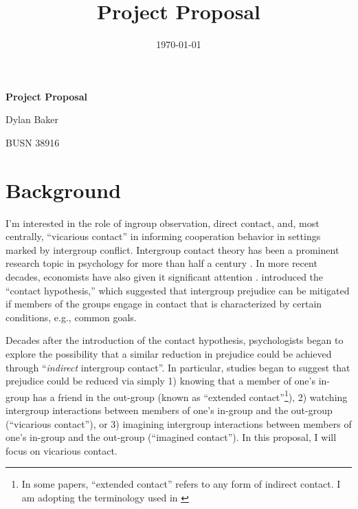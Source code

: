 \documentclass[10pt]{article}
\title{Project Proposal}
\newif\ifdraft
\begin{document}
\begin{titlepage}
    \pagestyle{empty} %
    \centering
    \vspace*{\fill}
    {\Huge\bfseries Project Proposal\par}
    \vspace{1.5cm}
    {\Large Dylan Baker\par}
    \vspace{1.5cm}
    {\large BUSN 38916\par}
    \vfill
    \date{\today}
\end{titlepage}

\newpage 


\section{Background}

I'm interested in the role of ingroup observation, direct contact, 
and, most centrally, ``vicarious contact'' in informing cooperation behavior
in settings marked by intergroup conflict.
Intergroup contact theory
\ifdraft(allport1954) \else\parencite{allport1954} \fi
has been a 
prominent research topic in 
psychology for more than half a century
\ifdraft(hewstone2011) \else\parencite{hewstone2011} \fi. 
In more recent decades, 
economists have also given 
it
significant attention
\ifdraft(bazzi2019, lowe2021) \else\parencite{bazzi2019, lowe2021} \fi
. 
\ifdraft(allport1954) \else\textcite{allport1954} \fi 
introduced the ``contact hypothesis,'' which
suggested that intergroup prejudice can be mitigated if members of 
the groups engage in contact that
is characterized by certain conditions, e.g., common goals.

Decades after the introduction of the contact hypothesis,
psychologists began to explore the possibility that 
a similar reduction in prejudice could be achieved through 
``\emph{indirect} intergroup contact''. In particular, studies 
began to suggest that prejudice could be reduced via 
simply 1) knowing that a member of one's in-group has a friend
in the out-group (known as ``extended contact''\footnote{In some papers, 
``extended contact'' refers to any form of indirect contact. I am adopting the
terminology used in 
\ifdraft(mazziotta2011) \else\textcite{mazziotta2011} \fi}),
2) watching intergroup interactions between 
members of one's in-group and the out-group (``vicarious contact''), or
3) imagining intergroup interactions between 
members of one's in-group and the out-group (``imagined contact'').
In this proposal, I will focus on vicarious contact.
\end{document}
